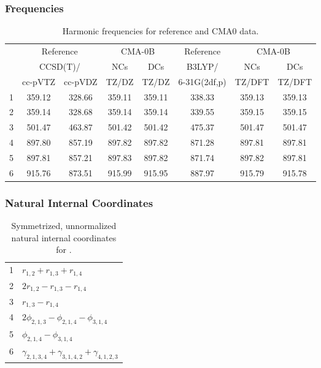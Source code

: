 \documentclass[10pt,oneside]{article}
\begin{document}
\clearpage

\subsubsection*{Frequencies}
\begin{table}[h!]
\centering
\caption{Harmonic frequencies for reference and CMA0 data.}
\begin{tabular}{cccccccc}
\toprule
{} & \multicolumn{2}{c}{Reference} & \multicolumn{2}{c}{CMA-0B} &    Reference & \multicolumn{2}{c}{CMA-0B} \\
{} & \multicolumn{2}{c}{CCSD(T)/} &    NCs &    DCs &       B3LYP/ &    NCs &    DCs \\
{} &   cc-pVTZ & cc-pVDZ &  TZ/DZ &  TZ/DZ & 6-31G(2df,p) & TZ/DFT & TZ/DFT \\
\midrule
1 &    359.12 &  328.66 & 359.11 & 359.11 &       338.33 & 359.13 & 359.13 \\
2 &    359.14 &  328.68 & 359.14 & 359.14 &       339.55 & 359.15 & 359.15 \\
3 &    501.47 &  463.87 & 501.42 & 501.42 &       475.37 & 501.47 & 501.47 \\
4 &    897.80 &  857.19 & 897.82 & 897.82 &       871.28 & 897.81 & 897.81 \\
5 &    897.81 &  857.21 & 897.83 & 897.82 &       871.74 & 897.82 & 897.81 \\
6 &    915.76 &  873.51 & 915.99 & 915.95 &       887.97 & 915.79 & 915.78 \\
\bottomrule
\end{tabular}
\end{table}

\clearpage

\subsubsection*{Natural Internal Coordinates}
\begin{table}[h!]
\centering
\caption{Symmetrized, unnormalized natural internal coordinates for .}
\small
\begin{tabular}{ll}
  1   & $r_{1,2} + r_{1,3} + r_{1,4}$ \\
  2   & $2r_{1,2} - r_{1,3} - r_{1,4}$ \\
  3   & $r_{1,3} - r_{1,4}$ \\
  4   & $2\phi_{2,1,3} - \phi_{2,1,4} - \phi_{3,1,4}$ \\
  5   & $\phi_{2,1,4} - \phi_{3,1,4}$ \\
  6   & $\gamma_{2,1,3,4} + \gamma_{3,1,4,2} + \gamma_{4,1,2,3}$ \\
\end{tabular}
\end{table}
\end{document}
